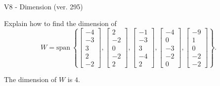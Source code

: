 \begin{exercise}
  \begin{exerciseTitle}V8 - Dimension (ver. 295)\end{exerciseTitle}
  \begin{exerciseStatement}
    Explain how to find the dimension of 
\[W=\mathrm{span}\ \left\{\left[\begin{array}{r}
-4 \\
-3 \\
3 \\
2 \\
-2
\end{array}\right] , \left[\begin{array}{r}
2 \\
-2 \\
0 \\
-2 \\
2
\end{array}\right] , \left[\begin{array}{r}
-1 \\
-3 \\
3 \\
-4 \\
2
\end{array}\right] , \left[\begin{array}{r}
-4 \\
0 \\
-3 \\
-2 \\
0
\end{array}\right] , \left[\begin{array}{r}
-9 \\
1 \\
0 \\
-2 \\
-2
\end{array}\right]\right\}.\]



  \end{exerciseStatement}
  \begin{exerciseAnswer}
   The dimension of \(W\) is  \(4\).
  


  \end{exerciseAnswer}
\end{exercise}